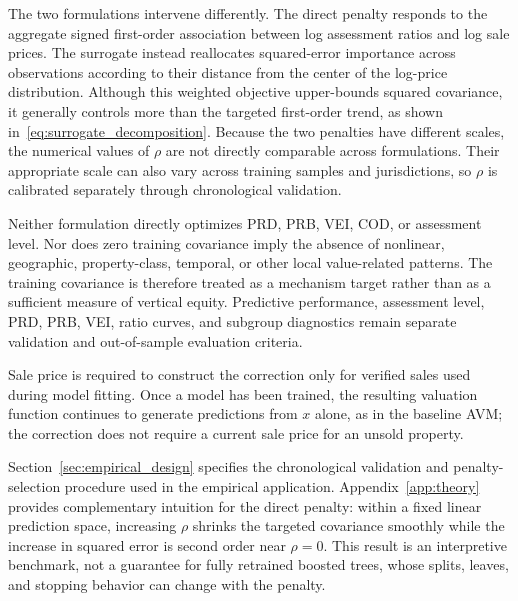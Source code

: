 \documentclass[10pt]{article}
\theoremstyle{definition}
\newcommand{\1}{\mathbf{1}}
\begin{document}
{{\textcolor{impGreen}{The two formulations intervene differently. The direct penalty responds to the aggregate signed first-order association between log assessment ratios and log sale prices. The surrogate instead reallocates squared-error importance across observations according to their distance from the center of the log-price distribution. Although this weighted objective upper-bounds squared covariance, it generally controls more than the targeted first-order trend, as shown in~\eqref{eq:surrogate_decomposition}. Because the two penalties have different scales, the numerical values of $\rho$ are not directly comparable across formulations. Their appropriate scale can also vary across training samples and jurisdictions, so $\rho$ is calibrated separately through chronological validation.}


\textcolor{impGreen}{Neither formulation directly optimizes PRD, PRB, VEI, COD, or assessment level. Nor does zero training covariance imply the absence of nonlinear, geographic, property-class, temporal, or other local value-related patterns. The training covariance is therefore treated as a mechanism target rather than as a sufficient measure of vertical equity. Predictive performance, assessment level, PRD, PRB, VEI, ratio curves, and subgroup diagnostics remain separate validation and out-of-sample evaluation criteria.}

\textcolor{impGreen}{Sale price is required to construct the correction only for verified sales used during model fitting. Once a model has been trained, the resulting valuation function continues to generate predictions from $x$ alone, as in the baseline AVM; the correction does not require a current sale price for an unsold property.}

\textcolor{impGreen}{Section~\ref{sec:empirical_design} specifies the chronological validation and penalty-selection procedure used in the empirical application. Appendix~\ref{app:theory} provides complementary intuition for the direct penalty: within a fixed linear prediction space, increasing $\rho$ shrinks the targeted covariance smoothly while the increase in squared error is second order near $\rho=0$. This result is an interpretive benchmark, not a guarantee for fully retrained boosted trees, whose splits, leaves, and stopping behavior can change with the penalty.}




}}
\end{document}
